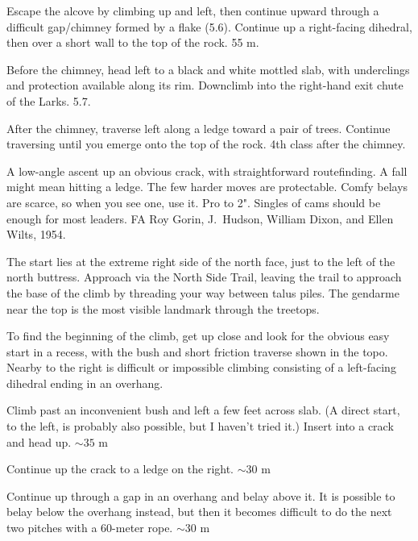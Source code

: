 \documentclass{tahquitz}
\begin{document}
 Escape the alcove by climbing up and left, then continue upward through a
difficult gap/chimney formed by a flake (5.6). Continue up a right-facing dihedral, then
over a short wall to the top
of the rock. 55 m.

 Before the chimney, head left to a black and white mottled slab, with underclings
and protection available along its rim. Downclimb into the right-hand exit chute of the Larks. 5.7.

 After the chimney, traverse left along a ledge toward a pair of trees. Continue
traversing until you emerge onto the top of the rock. 4th class after the chimney.




A low-angle ascent up an obvious crack, with straightforward routefinding.
A fall might mean hitting a ledge. The few harder moves
are protectable. Comfy belays are scarce, so when you see one, use
it. Pro to 2". Singles of cams should be enough for most leaders.
FA Roy Gorin, J.~Hudson, William Dixon, and Ellen Wilts, 1954.

The start lies at  the extreme right side of the north face, just to
the left of the north buttress. Approach via the North Side Trail,
leaving the trail to approach the base of the climb by threading your
way between talus piles. The gendarme near the top is the most
visible landmark through the treetops.

To find the beginning of the climb, get up close and look for the
obvious easy start in a recess, with the bush and short friction
traverse shown in the topo. Nearby to the right is difficult or
impossible climbing consisting of a left-facing dihedral ending in an
overhang. 

 Climb past an inconvenient bush and left a few feet across slab.
(A direct start, to the left, is probably also possible, but I haven't tried it.)
Insert into a crack and head up. $\sim 35$ m

 Continue up the crack to a ledge on the right.  $\sim 30$ m

 Continue up through a gap in an overhang and belay above it.
It is possible to belay below the overhang instead, but then it becomes
difficult to do the next two pitches with a 60-meter rope. $\sim 30$ m
\end{document}
